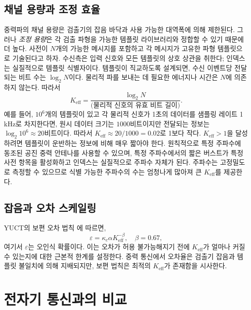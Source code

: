 \documentclass[12pt,a4paper]{article}
\newcommand{\Keff}{K_{\mathrm{eff}}}
\newcommand{\kappac}{\kappa_c}
\newcommand{\eps}{\varepsilon}
\begin{document}
	\subsection{채널 용량과 조정 효율}
	
	중력파의 채널 용량은 검출기의 잡음 바닥과 사용 가능한 대역폭에 의해 제한된다. 그러나 \emph{조정 용량}은 각 검출 파형을 가능한 템플릿 라이브러리와 정합할 수 있기 때문에 더 높다. 사전이 \(N\)개의 가능한 메시지를 포함하고 각 메시지가 고유한 파형 템플릿으로 기술된다고 하자. 수신측은 입력 신호와 모든 템플릿의 상호 상관을 취한다; 인덱스는 실질적으로 템플릿 식별자이다. 템플릿이 직교하도록 설계되면, 수신 이벤트당 전달되는 비트 수는 \(\log_2 N\)이다. 물리적 파를 보내는 데 필요한 에너지나 시간은 \(N\)에 의존하지 않는다. 따라서
	\begin{equation}
		\Keff = \frac{\log_2 N}{\text{(물리적 신호의 유효 비트 길이)}}.
	\end{equation}
	예를 들어, \(10^6\)개의 템플릿이 있고 각 물리적 신호가 1초의 데이터를 샘플링 레이트 1 kHz로 차지한다면, 원시 데이터 크기는 \(1000\)비트이지만 전달되는 정보는 \(\log_2 10^6 \approx 20\)비트이다. 따라서 \(\Keff \approx 20/1000 = 0.02\)로 1보다 작다. \(\Keff > 1\)을 달성하려면 템플릿이 운반하는 정보에 비해 매우 짧아야 한다. 원칙적으로 특정 주파수에 동조된 공진 중력 안테나를 사용할 수 있으며, 특정 주파수에서의 짧은 버스트가 특정 사전 항목을 활성화하고 인덱스는 실질적으로 주파수 자체가 된다. 주파수는 고정밀도로 측정할 수 있으므로 식별 가능한 주파수의 수는 엄청나게 많아져 큰 \(\Keff\)를 제공한다.
	
	\subsection{잡음과 오차 스케일링}
	
	YUCT의 보편 오차 법칙 \cite{AppendixL}에 따르면,
	\begin{equation}
		\eps = \kappac \alpha \Keff^{-\beta}, \quad \beta = 0.67,
		\label{eq:universal-scaling}
	\end{equation}
	여기서 \(\eps\)는 오인식 확률이다. 이는 오차가 허용 불가능해지기 전에 \(\Keff\)가 얼마나 커질 수 있는지에 대한 근본적 한계를 설정한다. 중력 통신에서 오차율은 검출기 잡음과 템플릿 불일치에 의해 지배되지만, 보편 법칙은 최적의 \(\Keff\)가 존재함을 시사한다.
	
	\section{전자기 통신과의 비교}
	\label{sec:comparison}
	
\end{document}
